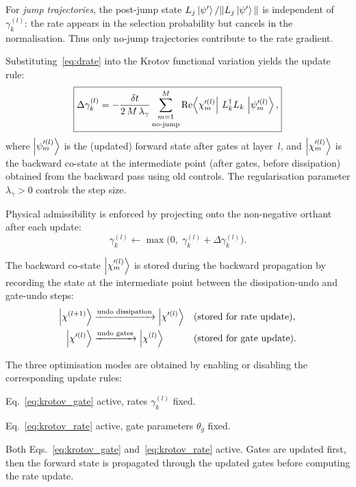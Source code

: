 \documentclass[11pt,a4paper]{article}
\begin{document}
For \emph{jump trajectories}, the post-jump state
$L_j\ket{\psi'}/\|L_j\ket{\psi'}\|$ is independent of
$\gamma_k^{(l)}$: the rate appears in the selection probability
but cancels in the normalisation.  Thus only no-jump trajectories
contribute to the rate gradient.

Substituting~\eqref{eq:drate} into the Krotov functional variation
yields the update rule:
\begin{equation}
\boxed{
\Delta\gamma_k^{(l)} = -\frac{\delta t}{2\,M\,\lambda_\gamma}
\sum_{\substack{m=1\\[2pt]\text{no-jump}}}^{M}
\operatorname{Re}\!\bra{\chi_m'^{(l)}}\,
L_k^\dagger L_k\,\ket{\psi_m'^{(l)}},
}
\label{eq:krotov_rate}
\end{equation}
where $\ket{\psi_m'^{(l)}}$ is the (updated) forward state after
gates at layer~$l$, and $\ket{\chi_m'^{(l)}}$ is the backward co-state
at the intermediate point (after gates, before dissipation) obtained
from the backward pass using old controls.  The regularisation parameter
$\lambda_\gamma > 0$ controls the step size.

Physical admissibility is enforced by projecting onto the non-negative
orthant after each update:
\begin{equation}
\gamma_k^{(l)} \leftarrow
\max\!\bigl(0,\; \gamma_k^{(l)} + \Delta\gamma_k^{(l)}\bigr).
\end{equation}

The backward co-state $\ket{\chi_m'^{(l)}}$ is stored during the
backward propagation by recording the state at the intermediate point
between the dissipation-undo and gate-undo steps:
\begin{align}
\ket{\chi^{(l+1)}} &\xrightarrow{\text{undo dissipation}} \ket{\chi'^{(l)}}
&& (\text{stored for rate update}), \\
\ket{\chi'^{(l)}} &\xrightarrow{\text{undo gates}} \ket{\chi^{(l)}}
&& (\text{stored for gate update}).
\end{align}

The three optimisation modes are obtained by enabling or disabling
the corresponding update rules:
\begin{description}[nosep]
\item[Gates-only:] Eq.~\eqref{eq:krotov_gate} active,
  rates $\gamma_k^{(l)}$ fixed.
\item[Rates-only:] Eq.~\eqref{eq:krotov_rate} active,
  gate parameters $\theta_g$ fixed.
\item[Joint:] Both Eqs.~\eqref{eq:krotov_gate}
  and~\eqref{eq:krotov_rate} active.  Gates are updated first, then
  the forward state is propagated through the updated gates before
  computing the rate update.
\end{description}
\end{document}
